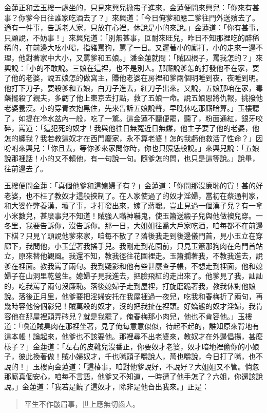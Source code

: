 金蓮正和孟玉樓一處坐的，只見來興兒掀帘子進來，金蓮便問來興兒：「你來有甚事？你爹今日往誰家吃酒去了？」來興道：「今日俺爹和應二爹往門外送殯去了。適有一件事，告訴老人家，只放在心裡，休說是小的來說。」金蓮道：「你有甚事，只顧說，不妨事！」來興兒道：「別無甚事，叵耐來旺兒，昨日不知那裡吃的醉稀稀的，在前邊大吆小喝，指豬罵狗，罵了一日。又邏著小的廝打，小的走來一邊不理，他對著家中大小，又罵爹和五娘。」潘金蓮就問：「賊囚根子，罵我怎的？」來興說：「小的不敢說。三娘在這裡，也不是別人。那廝說爹怎的打發他不在家，耍了他的老婆，說五娘怎的做窩主，賺他老婆在房裡和爹兩個明睡到夜，夜睡到明。他打下刀子，要殺爹和五娘，白刀子進去，紅刀子出來。又說，五娘那咱在家，毒藥擺殺了親夫，多虧了他上東京去打點，救了五娘一命。說五娘恩將仇報，挑撥他老婆養漢。小的穿青衣抱黑住，先來告訴五娘說聲，早晚休吃那廝暗算。」玉樓聽了，如提在冷水盆內一般，吃了一驚。這金蓮不聽便罷，聽了，粉面通紅，銀牙咬碎，罵道：「這犯死的奴才！我與他往日無冤近日無讎，他主子要了他的老婆，他怎的纏我？我若教這奴才在西門慶家，永不算老婆！怎的我虧他救活了性命？」因吩咐來興兒：「你且去，等你爹來家問你時，你也只照恁般說。」來興兒說：「五娘說那裡話！小的又不賴他，有一句說一句。隨爹怎的問，也只是這等說。」說畢，往前邊去了。

玉樓便問金蓮：「真個他爹和這媳婦子有？」金蓮道：「你問那沒廉恥的貨！甚的好老婆，也不枉了教奴才這般挾制了。在人家使過了的奴才淫婦，當初在蔡通判家，和大婆作弊養漢，壞了事，才打發出來，嫁了蔣聰。豈止見過一個漢子兒？有一拿小米數兒，甚麼事兒不知道！賊強人瞞神嚇鬼，使玉簫送緞子兒與他做襖兒穿。一冬里，我要告訴你，沒告訴你。那一日，大姐姐往喬大戶家吃酒，咱每都不在前邊下棋？只見丫頭說他爹來家，咱每不散了？落後我走到後邊儀門首，見小玉立在穿廊下，我問他，小玉望著我搖手兒。我剛走到花園前，只見玉簫那狗肉在角門首站立，原來替他觀風。我還不知，教我徑往花園裡走。玉簫攔著我，不教我進去，說爹在裡面。教我罵了兩句。我到疑影和他有些甚麼查子帳，不想走到裡面，他和媳婦子在山洞里乾營生。媳婦子見我進去，把臉飛紅的走出來了。他爹見了我，訕訕的，吃我罵了兩句沒廉恥。落後媳婦子走到屋裡，打旋磨跪著我，教我休對他娘說。落後正月里，他爹要把淫婦安托在我屋裡過一夜兒，吃我和春梅折了兩句，再幾時容他傍個影兒！賊萬殺的奴才，沒的把我扯在裡頭。好嬌態的奴才淫婦，我肯容他在那屋裡頭弄硶兒？就是我罷了，俺春梅那小肉兒，他也不肯容他。」玉樓道：「嗔道賊臭肉在那裡坐著，見了俺每意意似似，待起不起的，誰知原來背地有這本帳！論起來，他爹也不該要他。那裡尋不出老婆來，教奴才在外邊倡揚，甚麼樣子？」金蓮道：「左右的皮靴兒沒番正，你要奴才老婆，奴才暗地裡偷你的小娘子，彼此換著做！賊小婦奴才，千也嘴頭子嚼說人，萬也嚼說，今日打了嘴，也不說的！」玉樓向金蓮道：「這椿事，咱對他爹說好，不說好？大姐姐又不管。倘忽那廝真個安心，咱每不言語，他爹又不知道，一時遭了他手怎了？六姐，你還該說說。」金蓮道：「我若是饒了這奴才，除非是他㒲出我來。」正是：
\begin{quote}
平生不作皺眉事，世上應無切齒人。
\end{quote}


